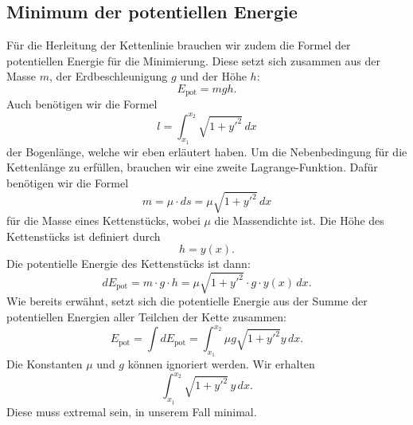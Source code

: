 \subsection{Minimum der potentiellen Energie
\label{kettenlinie:subsection:Minimum der potentiellen Energie}}
Für die Herleitung der Kettenlinie brauchen wir zudem die Formel der potentiellen Energie für die Minimierung. Diese setzt sich zusammen aus der Masse \(m\), der Erdbeschleunigung \(g\) und der Höhe \(h\):
\begin{equation}
	E_{\text{pot}}
	=
	mgh.
\end{equation}
Auch benötigen wir die Formel 
\begin{equation}
	l
	=
	\int_{x_1}^{x_2} \sqrt{1 + y'^2} \, dx
\end{equation}
der Bogenlänge, welche wir eben erläutert haben.
Um die Nebenbedingung für die Kettenlänge zu erfüllen, brauchen wir eine zweite Lagrange-Funktion.
Dafür benötigen wir die Formel
\begin{equation}
	m = \mu \cdot ds = \mu \sqrt{1 + y'^2} \, dx
\end{equation}
für die Masse eines Kettenstücks, wobei \(\mu\) die Massendichte ist.
%
Die Höhe des Kettenstücks ist definiert durch
\begin{equation}
	h = y(x).
\end{equation}
Die potentielle Energie des Kettenstücks ist dann:
\begin{equation}
	dE_{\text{pot}} = m \cdot g \cdot h = \mu \sqrt{1 + y'^2} \cdot g \cdot y(x) \, dx.
\end{equation}
Wie bereits erwähnt, setzt sich die potentielle Energie aus der Summe der potentiellen Energien aller Teilchen der Kette zusammen:
\begin{equation}
	E_{\text{pot}} = \int dE_{\text{pot}} = \int_{x_1}^{x_2} \mu g \sqrt{1 + y'^2} y  \, dx.
\end{equation}
Die Konstanten \(\mu\) und \(g\) können ignoriert werden.
Wir erhalten
\begin{equation}
	\int_{x_1}^{x_2} \sqrt{1 + y'^2} \, y \, dx.
\end{equation}
Diese muss extremal sein, in unserem Fall minimal.

